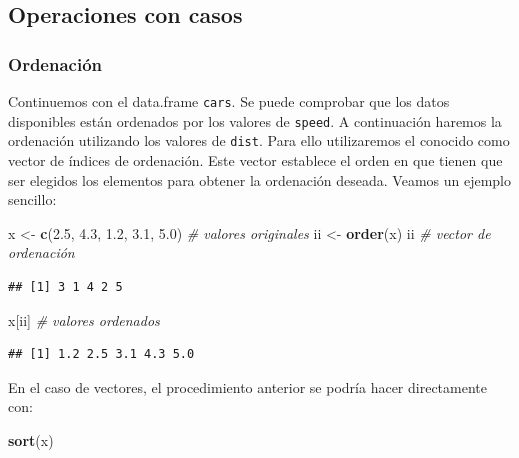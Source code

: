 \documentclass[]{book}
\newenvironment{Shaded}{\begin{snugshade}}{\end{snugshade}}
\newcommand{\KeywordTok}[1]{\textcolor[rgb]{0.13,0.29,0.53}{\textbf{#1}}}
\newcommand{\FloatTok}[1]{\textcolor[rgb]{0.00,0.00,0.81}{#1}}
\newcommand{\StringTok}[1]{\textcolor[rgb]{0.31,0.60,0.02}{#1}}
\newcommand{\CommentTok}[1]{\textcolor[rgb]{0.56,0.35,0.01}{\textit{#1}}}
\newcommand{\NormalTok}[1]{#1}
\begin{document}
\subsection{Operaciones con casos}\label{operaciones-con-casos}

\subsubsection{Ordenación}\label{ordenacion}

Continuemos con el data.frame \texttt{cars}. Se puede comprobar que los
datos disponibles están ordenados por los valores de \texttt{speed}. A
continuación haremos la ordenación utilizando los valores de
\texttt{dist}. Para ello utilizaremos el conocido como vector de índices
de ordenación. Este vector establece el orden en que tienen que ser
elegidos los elementos para obtener la ordenación deseada. Veamos un
ejemplo sencillo:

\begin{Shaded}
\begin{Highlighting}[]
\NormalTok{x <-}\StringTok{ }\KeywordTok{c}\NormalTok{(}\FloatTok{2.5}\NormalTok{, }\FloatTok{4.3}\NormalTok{, }\FloatTok{1.2}\NormalTok{, }\FloatTok{3.1}\NormalTok{, }\FloatTok{5.0}\NormalTok{) }\CommentTok{# valores originales}
\NormalTok{ii <-}\StringTok{ }\KeywordTok{order}\NormalTok{(x)}
\NormalTok{ii    }\CommentTok{# vector de ordenación}
\end{Highlighting}
\end{Shaded}

\begin{verbatim}
## [1] 3 1 4 2 5
\end{verbatim}

\begin{Shaded}
\begin{Highlighting}[]
\NormalTok{x[ii] }\CommentTok{# valores ordenados}
\end{Highlighting}
\end{Shaded}

\begin{verbatim}
## [1] 1.2 2.5 3.1 4.3 5.0
\end{verbatim}

En el caso de vectores, el procedimiento anterior se podría hacer
directamente con:

\begin{Shaded}
\begin{Highlighting}[]
\KeywordTok{sort}\NormalTok{(x)}
\end{Highlighting}
\end{Shaded}
\end{document}
